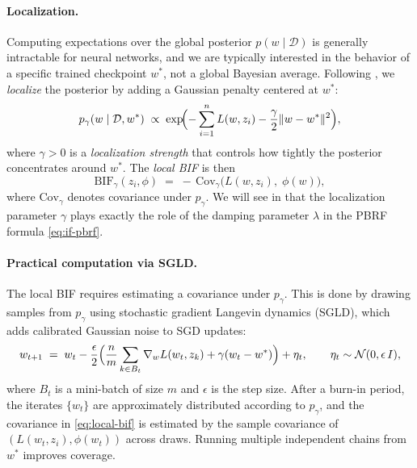 \documentclass[11pt]{article}
\begin{document}
\paragraph{Localization.} Computing expectations over the global posterior $p(w\mid\mathcal{D})$ is generally intractable for neural networks, and we are typically interested in the behavior of a specific trained checkpoint $w^*$, not a global Bayesian average. Following \citet{kreer2025bif}, we \emph{localize} the posterior by adding a Gaussian penalty centered at $w^*$:
\begin{equation}\label{eq:local-posterior}
  p_\gamma(w\mid\mathcal{D},w^*) \;\propto\; \exp\!\Bigl(-\sum_{i=1}^n L(w,z_i) - \frac{\gamma}{2}\|w - w^*\|^2\Bigr),
\end{equation}
where $\gamma > 0$ is a \emph{localization strength} that controls how tightly the posterior concentrates around $w^*$. The \emph{local BIF} is then
\begin{equation}\label{eq:local-bif}
  \mathrm{BIF}_\gamma(z_i,\phi) \;=\; -\,\mathrm{Cov}_\gamma\bigl(L(w,z_i),\;\phi(w)\bigr),
\end{equation}
where $\mathrm{Cov}_\gamma$ denotes covariance under $p_\gamma$. We will see in  that the localization parameter $\gamma$ plays exactly the role of the damping parameter $\lambda$ in the PBRF formula \eqref{eq:if-pbrf}.

\paragraph{Practical computation via SGLD.} The local BIF requires estimating a covariance under $p_\gamma$. This is done by drawing samples from $p_\gamma$ using stochastic gradient Langevin dynamics (SGLD), which adds calibrated Gaussian noise to SGD updates:
\[
  w_{t+1} \;=\; w_t - \frac{\epsilon}{2}\Bigl(\frac{n}{m}\sum_{k\in B_t}\nabla_w L(w_t,z_k) + \gamma(w_t - w^*)\Bigr) + \eta_t, \qquad \eta_t\sim\mathcal{N}(0,\epsilon\, I),
\]
where $B_t$ is a mini-batch of size $m$ and $\epsilon$ is the step size. After a burn-in period, the iterates $\{w_t\}$ are approximately distributed according to $p_\gamma$, and the covariance in \eqref{eq:local-bif} is estimated by the sample covariance of $(L(w_t,z_i),\phi(w_t))$ across draws. Running multiple independent chains from $w^*$ improves coverage.
\end{document}
